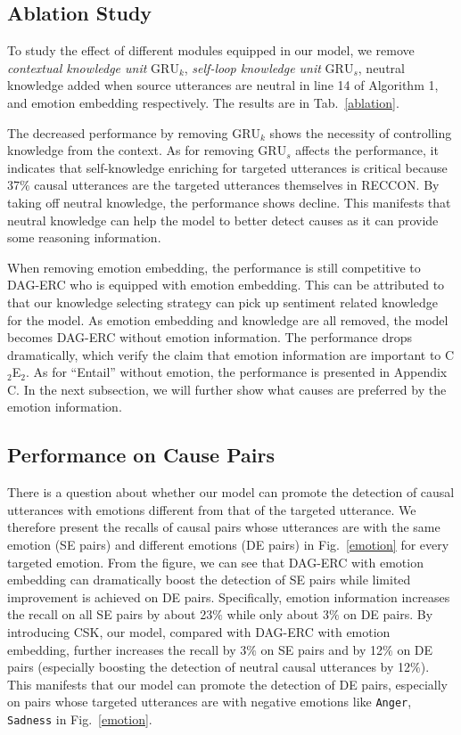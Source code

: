 \documentclass{article}
\begin{document}
\subsection{Ablation Study}

To study the effect of different modules equipped in our model, we remove \textit{contextual knowledge unit} $\mathrm{GRU}_k$, \textit{self-loop knowledge unit} $\mathrm{GRU}_s$, neutral knowledge added when source utterances are neutral in line 14 of Algorithm 1, and emotion embedding respectively. The results are in Tab.~\ref{ablation}. 

The decreased performance by removing $\mathrm{GRU}_k$ shows the necessity of controlling knowledge from the context. As for removing $\mathrm{GRU}_s$ affects the performance, it indicates that self-knowledge enriching for targeted utterances is critical because 37$\%$ causal utterances are the targeted utterances themselves in RECCON. By taking off neutral knowledge, the performance shows decline. This manifests that neutral knowledge can help the model to better detect causes as it can provide some reasoning information. 

When removing emotion embedding, the performance is still competitive to DAG-ERC who is equipped with emotion embedding. This can be attributed to that our knowledge selecting strategy can pick up sentiment related knowledge for the model. As emotion embedding and knowledge are all removed, the model becomes DAG-ERC without emotion information. The performance drops dramatically, which verify the claim that emotion information are important to C$_2$E$_2$. As for ``Entail'' without emotion, the performance is presented in Appendix C. In the next subsection, we will further show what causes are preferred by the emotion information. 




\subsection{Performance on Cause Pairs}

There is a question about whether our model can promote the detection of causal utterances with emotions different from that of the targeted utterance. We therefore present the recalls of causal pairs whose utterances are with the same emotion (SE pairs) and different emotions (DE pairs) in Fig.~\ref{emotion} for every targeted emotion. From the figure, we can see that DAG-ERC with emotion embedding can dramatically boost the detection of SE pairs while limited improvement is achieved on DE pairs. Specifically, emotion information increases the recall on all SE pairs by about 23$\%$ while only about 3$\%$ on DE pairs. By introducing CSK, our model, compared with DAG-ERC with emotion embedding, further increases the recall by 3$\%$ on SE pairs and by 12$\%$ on DE pairs (especially boosting the detection of neutral causal utterances by 12$\%$). This manifests that our model can promote the detection of DE pairs, especially on pairs whose targeted utterances are with negative emotions like \texttt{Anger}, \texttt{Sadness} in Fig.~\ref{emotion}. 
\end{document}

